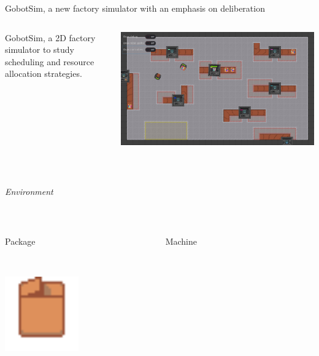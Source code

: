 \begin{frame}{GobotSim, a new factory simulator with an emphasis on deliberation}
    \begin{columns}
        \begin{column}{0.5\textwidth}
            GobotSim, a 2D factory simulator to study scheduling and resource allocation strategies.
        \end{column}
        \begin{column}{0.4\textwidth}
            \includegraphics[width=\linewidth]{images/gobot-rae.png}
        \end{column}
    \end{columns}
    
    ~~

\pause
    \centering
    \emph{Environment}

~~

\pause
    \begin{columns}
        \begin{column}{0.3\textwidth}
            \centering
            Package

            ~~

            \includegraphics[width = 0.5\textwidth]{images/godot/package.png}
        \end{column}
        \pause
        \begin{column}{0.3\textwidth}
            \centering
            Machine


\end{column}
\end{columns}
\end{frame}
